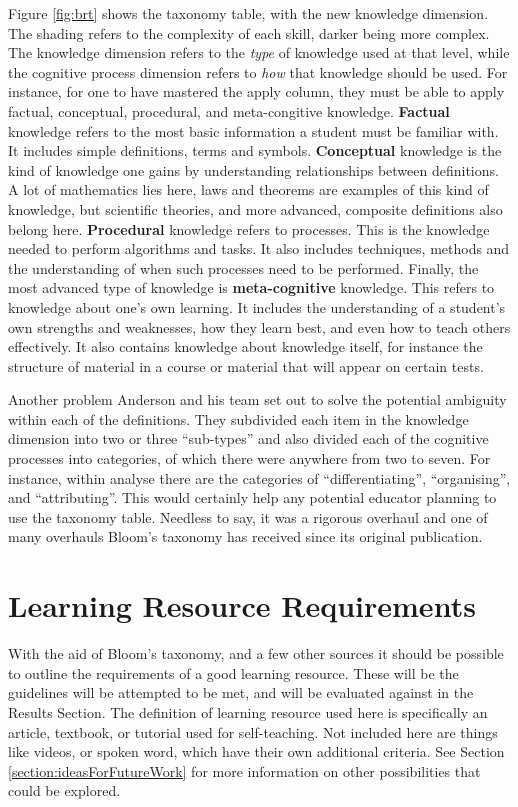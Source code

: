Figure \ref{fig:brt} shows the taxonomy table, with the new knowledge dimension. The shading refers to the complexity of each skill, darker being more complex. The knowledge dimension refers to the \textit{type} of knowledge used at that level, while the cognitive process dimension refers to \textit{how} that knowledge should be used. For instance, for one to have mastered the apply column, they must be able to apply factual, conceptual, procedural, and meta-congitive knowledge. \textbf{Factual} knowledge refers to the most basic information a student must be familiar with. It includes simple definitions, terms and symbols. \textbf{Conceptual} knowledge is the kind of knowledge one gains by understanding relationships between definitions. A lot of mathematics lies here, laws and theorems are examples of this kind of knowledge, but scientific theories, and more advanced, composite definitions also belong here. \textbf{Procedural} knowledge refers to processes. This is the knowledge needed to perform algorithms and tasks. It also includes techniques, methods and the understanding of when such processes need to be performed. Finally, the most advanced type of knowledge is \textbf{meta-cognitive} knowledge. This refers to knowledge about one's own learning. It includes the understanding of a student's own strengths and weaknesses, how they learn best, and even how to teach others effectively. It also contains knowledge about knowledge itself, for instance the structure of material in a course or material that will appear on certain tests.

Another problem Anderson and his team set out to solve the potential ambiguity within each of the definitions. They subdivided each item in the knowledge dimension into two or three ``sub-types'' and also divided each of the cognitive processes into categories, of which there were anywhere from two to seven. For instance, within analyse there are the categories of ``differentiating'', ``organising'', and ``attributing''. This would certainly help any potential educator planning to use the taxonomy table. Needless to say, it was a rigorous overhaul and one of many overhauls Bloom's taxonomy has received since its original publication.

\section{Learning Resource Requirements}

With the aid of Bloom's taxonomy, and a few other sources it should be possible to outline the requirements of a good learning resource. These will be the guidelines will be attempted to be met, and will be evaluated against in the Results Section. The definition of learning resource used here is specifically an article, textbook, or tutorial used for self-teaching. Not included here are things like videos, or spoken word, which have their own additional criteria. See Section \ref{section:ideasForFutureWork} for more information on other possibilities that could be explored.

